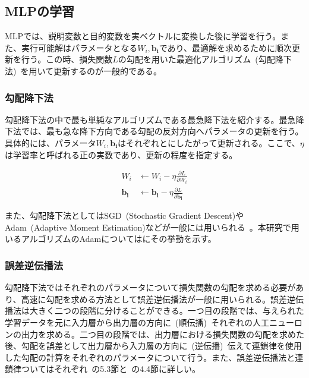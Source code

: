 \clearpage

\subsection{MLPの学習}

MLPでは、説明変数と目的変数を実ベクトルに変換した後に学習を行う。また、実行可能解はパラメータとなる$W_i,\boldsymbol{b_i}$であり、最適解を求めるために順次更新を行う。この時、損失関数$L$の勾配を用いた最適化アルゴリズム~(勾配降下法)~を用いて更新するのが一般的である。

\subsubsection{勾配降下法}
\label{sec:grad}

勾配降下法の中で最も単純なアルゴリズムである最急降下法を紹介する。最急降下法では、最も急な降下方向である勾配の反対方向へパラメータの更新を行う。具体的には、パラメータ$W_i,\boldsymbol{b_i}$はそれぞれとにしたがって更新される。ここで、$\eta$は学習率と呼ばれる正の実数であり、更新の程度を指定する。

\begin{align}
    \label{eq:MLP2_0}
    W _i &\leftarrow W_i - \eta \frac{\partial L}{\partial W_i} \\
    \label{eq:MLP2_1}
    \boldsymbol{b _i} &\leftarrow \boldsymbol{b_i} - \eta \frac{\partial L}{\partial \boldsymbol{b_i}}
\end{align}

また、勾配降下法としてはSGD~(Stochastic Gradient Descent)やAdam~(Adaptive Moment Estimation)などが一般には用いられる~\cite{GradientDescent}。本研究で用いるアルゴリズムのAdamについてはにその挙動を示す。

\subsubsection{誤差逆伝播法}

勾配降下法ではそれぞれのパラメータについて損失関数の勾配を求める必要があり、高速に勾配を求める方法として誤差逆伝播法が一般に用いられる。誤差逆伝播法は大きく二つの段階に分けることができる。一つ目の段階では、与えられた学習データを元に入力層から出力層の方向に~(順伝播)~それぞれの人工ニューロンの出力を求める。二つ目の段階では、出力層における損失関数の勾配を求めた後、勾配を誤差として出力層から入力層の方向に~(逆伝播)~伝えて連鎖律を使用した勾配の計算をそれぞれのパラメータについて行う。また、誤差逆伝播法と連鎖律ついてはそれぞれ~\cite{Bishop}の5.3節と~\cite{Calculus}の4.4節に詳しい。

